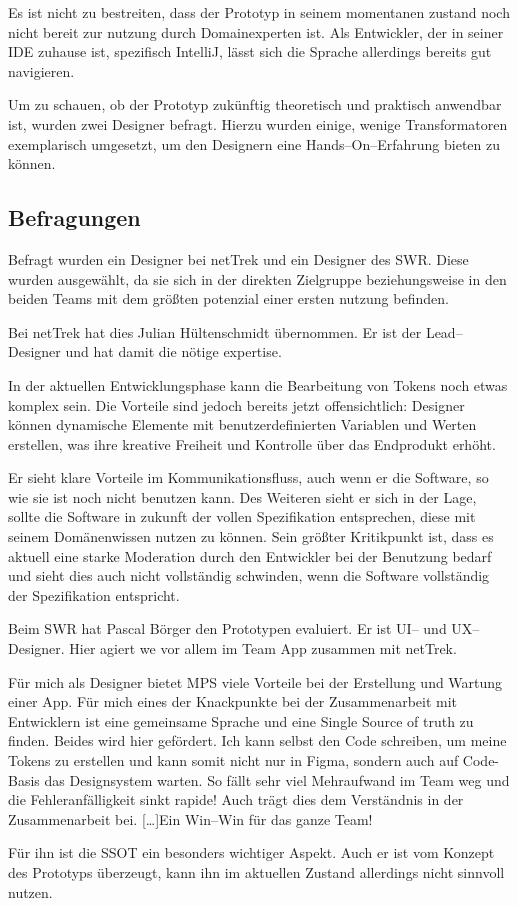 Es ist nicht zu bestreiten, dass der Prototyp in seinem momentanen zustand noch nicht bereit zur nutzung durch Domainexperten ist.
Als Entwickler, der in seiner \ac{IDE} zuhause ist, spezifisch IntelliJ, lässt sich die Sprache allerdings bereits gut navigieren.

Um zu schauen, ob der Prototyp zukünftig theoretisch und praktisch anwendbar ist, wurden zwei Designer befragt.
Hierzu wurden einige, wenige Transformatoren exemplarisch umgesetzt, um den Designern eine Hands--On--Erfahrung bieten zu können.

\subsection{Befragungen}\label{subsec:befragungen}
Befragt wurden ein Designer bei \ac{netTrek} und ein Designer des \ac{SWR}.
Diese wurden ausgewählt, da sie sich in der direkten Zielgruppe beziehungsweise in den beiden Teams mit dem größten potenzial einer ersten nutzung befinden.

Bei \ac{netTrek} hat dies Julian Hültenschmidt übernommen.
Er ist der Lead--Designer und hat damit die nötige expertise.
\begin{displayquote}
    In der aktuellen Entwicklungsphase kann die Bearbeitung von Tokens noch etwas komplex sein.
    Die Vorteile sind jedoch bereits jetzt offensichtlich: Designer können dynamische Elemente mit benutzerdefinierten Variablen und Werten erstellen, was ihre kreative Freiheit und Kontrolle über das Endprodukt erhöht.
\end{displayquote}
Er sieht klare Vorteile im Kommunikationsfluss, auch wenn er die Software, so wie sie ist noch nicht benutzen kann.
Des Weiteren sieht er sich in der Lage, sollte die Software in zukunft der vollen Spezifikation entsprechen, diese mit seinem Domänenwissen nutzen zu können.
Sein größter Kritikpunkt ist, dass es aktuell eine starke Moderation durch den Entwickler bei der Benutzung bedarf und sieht dies auch nicht vollständig schwinden, wenn die Software vollständig der Spezifikation entspricht.

Beim \ac{SWR} hat Pascal Börger den Prototypen evaluiert.
Er ist \acs{UI}-- und \acs{UX}--Designer.
Hier agiert we vor allem im Team App zusammen mit \ac{netTrek}.
\begin{displayquote}
    Für mich als Designer bietet MPS viele Vorteile bei der Erstellung und Wartung einer App.
    Für mich eines der Knackpunkte bei der Zusammenarbeit mit Entwicklern ist eine gemeinsame Sprache und eine Single Source of truth zu finden.
    Beides wird hier gefördert.
    Ich kann selbst den Code schreiben, um meine Tokens zu erstellen und kann somit nicht nur in Figma, sondern auch auf Code-Basis das Designsystem warten.
    So fällt sehr viel Mehraufwand im Team weg und die Fehleranfälligkeit sinkt rapide!
    Auch trägt dies dem Verständnis in der Zusammenarbeit bei.
    [\ldots]\@ Ein Win--Win für das ganze Team!
\end{displayquote}
Für ihn ist die \ac{SSOT} ein besonders wichtiger Aspekt.
Auch er ist vom Konzept des Prototyps überzeugt, kann ihn im aktuellen Zustand allerdings nicht sinnvoll nutzen.

